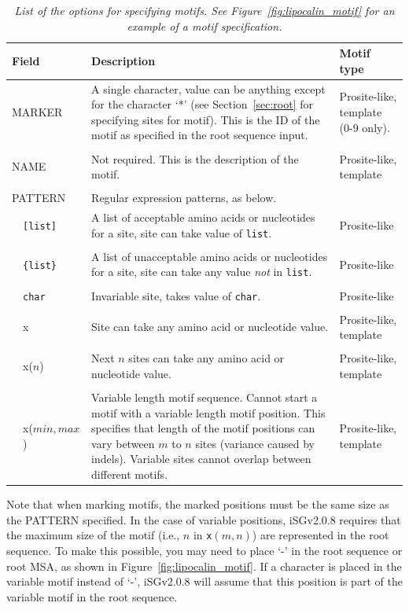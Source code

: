 \documentclass[10pt]{article}
\newcommand{\version}{2.0.8 }
\newcommand{\iSGcurrentshort}{iSGv\version }
\begin{document}
  \begin{table}
   \caption{\textit{List of the options for specifying motifs. See Figure~\ref{fig:lipocalin_motif} for an example of a motif specification.}}
   \begin{tabular}{p{0.1in}p{1in}p{3in}p{1.5in}}
	\hline\hline
	\multicolumn{2}{l}{Field} & Description & Motif type \\
	\hline
    \multicolumn{2}{l}{MARKER} &  A single character, value can be anything except for the character `*' (see Section~\ref{sec:root} for specifying sites for motif).  This is the ID of the motif as specified in the root sequence input. & Prosite-like, template (0-9 only). \\\\
    \multicolumn{2}{l}{NAME} & Not required. This is the description of the motif. & Prosite-like, template\\\\
    \multicolumn{2}{l}{PATTERN} & Regular expression patterns, as below.\\
	 & {\tt [list]} & A list of acceptable amino acids or nucleotides for a site, site can take value of {\tt list}. & Prosite-like \\\\
	 & {\tt \{list\}} & A list of unacceptable amino acids or nucleotides for a site, site can take any value \emph{not} in {\tt list}. & Prosite-like \\\\
	 & {\tt char} & Invariable site, takes value of {\tt char}. & Prosite-like \\\\
	 & x & Site can take any amino acid or nucleotide value. & Prosite-like, template \\\\
	 & x($n$) & Next $n$ sites can take any amino acid or nucleotide value. & Prosite-like, template \\\\
	 & x($min,max$) & Variable length motif sequence. Cannot start a motif with a variable length motif position. This specifies that length of the motif positions can vary between $m$ to $n$ sites (variance caused by indels). Variable sites cannot overlap between different motifs. & Prosite-like, template \\
	\hline
   \end{tabular}
   \label{tab:motif_spec}
  \end{table}

 Note that when marking motifs, the marked positions must be the same size as the PATTERN specified. In the case of variable positions, \iSGcurrentshort requires that the maximum size of the motif (i.e., $n$ in {\tt x$(m,n)$}) are represented in the root sequence. To make this possible, you may need to place `-' in the root sequence or root MSA, as shown in Figure~\ref{fig:lipocalin_motif}. If a character is placed in the variable motif instead of `-', \iSGcurrentshort will assume that this position is part of the variable motif in the root sequence.
 
\end{document}
